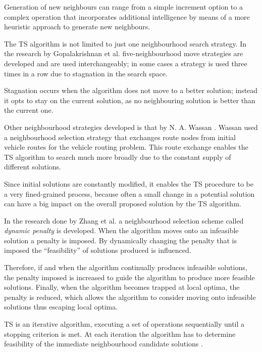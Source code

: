 Generation of new neighbours can range from a simple increment option to a complex operation that incorporates additional intelligence by means of a more heuristic approach to generate new neighbours.

The \gls{TS} algorithm is not limited to just one neighbourhood search strategy. In the research by Gopalakrishnan et al.\cite{TabuCarryOver} five-neighbourhood move strategies are developed and are used interchangeably; in some cases a strategy is used three times in a row due to stagnation in the search space. 

Stagnation occurs when the algorithm does not move to a better solution; instead it opts to stay on the current solution, as no neighbouring solution is better than the current one. 

Other neighbourhood strategies developed is that by N. A. Wassan \cite{ReactiveTabuVHR}. Wassan used a neighbourhood selection strategy that exchanges route nodes from initial vehicle routes for the vehicle routing problem. This route exchange enables the \gls{TS} algorithm to search much more broadly due to the constant supply of different solutions. 

Since initial solutions are constantly modified, it enables the \gls{TS} procedure to be a very fined-grained process, because often a small change in a potential solution can have a big impact on the overall proposed solution by the \gls{TS} algorithm.

In the research done by Zhang et al.\cite{TSHazardous} a neighbourhood selection scheme called \emph{dynamic penalty} is developed. When the algorithm moves onto an infeasible solution a penalty is imposed. By dynamically changing the penalty that is imposed the ``feasibility'' of solutions produced is influenced. 

Therefore, if and when the algorithm continually produces infeasible solutions, the penalty imposed is increased to guide the algorithm to produce more feasible solutions. Finally, when the algorithm becomes trapped at local optima, the penalty is reduced, which allows the algorithm to consider moving onto infeasible solutions thus escaping local optima.

TS is an iterative algorithm, executing a set of operations sequentially until a stopping criterion is met\cite{EvoParallelTabu,TabuVechicleRoutingWithTimeWindows}. At each iteration the algorithm has to determine feasibility of the immediate neighbourhood candidate solutions \cite{EvoParallelTabu,TabuVechicleRoutingWithTimeWindows}. 

